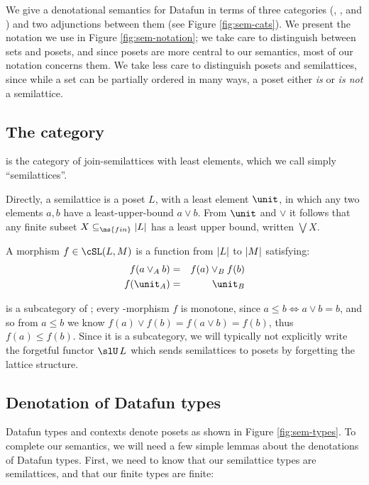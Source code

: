 
We give a denotational semantics for Datafun in terms of three categories
(\cSet{}, \cPoset{}, and \cSL{}) and two adjunctions between them (see Figure
\ref{fig:sem-cats}). We present the notation we use in Figure
\ref{fig:sem-notation}; we take care to distinguish between sets and posets, and
since posets are more central to our semantics, most of our notation concerns
them. We take less care to distinguish posets and semilattices, since while a
set can be partially ordered in many ways, a poset either \emph{is} or \emph{is
  not} a semilattice.

\subsection{The category \cSL{}}

\cSL{} is the category of join-semilattices with least elements, which we call
simply ``semilattices''.

Directly, a semilattice is a poset $L$, with a least element $\unit$, in which
any two elements $a,b$ have a least-upper-bound $a \vee b$. From $\unit$ and
$\vee$ it follows that any finite subset $X \subseteq_{\ms{fin}} \U{L}$ has a
least upper bound, written $\bigvee X$.

A morphism $f \in \cSL(L, M)$ is a function from $|L|$ to $|M|$ satisfying:
\begin{eqnarray*}
  f(a \vee_A b) &=& f(a) \vee_B f(b)\\
  f(\unit_A) &=& \unit_B
\end{eqnarray*}

\cSL{} is a subcategory of ; every \cSL{}-morphism $f$ is monotone,
since $a \le b \iff a \vee b = b$, and so from $a \le b$ we know $f(a) \vee f(b)
= f(a \vee b) = f(b)$, thus $f(a) \le f(b)$. Since it is a subcategory, we will
typically not explicitly write the forgetful functor $\slU\,L$ which sends
semilattices to posets by forgetting the lattice structure.


\subsection{Denotation of Datafun types}

Datafun types and contexts denote posets as shown in Figure \ref{fig:sem-types}.
To complete our semantics, we will need a few simple lemmas about the
denotations of Datafun types. First, we need to know that our semilattice types
are semilattices, and that our finite types are finite:

